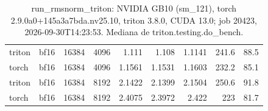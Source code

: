\begin{table}[htbp]
\begin{tabular}{llrrrrrrr}
    triton & bf16 & 16384 & 4096 & 1.111 & 1.108 & 1.1141 & 241.6 & 88.5 \\
    torch & bf16 & 16384 & 4096 & 1.1561 & 1.1531 & 1.1603 & 232.2 & 85.1 \\
    triton & bf16 & 16384 & 8192 & 2.1422 & 2.1399 & 2.1504 & 250.6 & 91.8 \\
    torch & bf16 & 16384 & 8192 & 2.4075 & 2.3972 & 2.422 & 223 & 81.7 \\
    \bottomrule
  \end{tabular}
  \caption{run\_rmsnorm\_triton: NVIDIA GB10 (sm\_121), torch 2.9.0a0+145a3a7bda.nv25.10, triton 3.8.0, CUDA 13.0; job 20423, 2026-09-30T14:23:53. Mediana de triton.testing.do\_bench.}
  \label{tab:hennessy-580-run-rmsnorm-triton}
\end{table}
